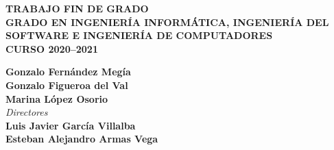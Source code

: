 \newpage
\thispagestyle{empty}
\renewcommand{\baselinestretch}{1}\normalsize
\vspace*{3ex}
  \begin{center}
       {}
  \end{center}
\vspace*{2ex}
\begin{center}
  {\Large {\bf TRABAJO FIN DE GRADO}}\\ [0.8em]
    {\Large {\bf GRADO EN INGENIER\'IA INFORM\'ATICA, INGENIERÍA DEL SOFTWARE E INGENIERÍA DE COMPUTADORES}}\\ [0.8em]
    {\Large {\bf CURSO 2020--2021}} 
\end{center}
\vspace*{2ex}
\begin{large}
\begin{center}
  {\bf Gonzalo Fernández Megía}\\ [0.3em]
  {\bf Gonzalo Figueroa del Val}\\ [0.3em]
  {\bf Marina López Osorio}\\
  
  
\vspace*{3ex}
{\it Directores}\\ [0.5em]
  {\bf Luis Javier Garc\'ia Villalba} \\ [0.3em]
  {\bf Esteban Alejandro Armas Vega}
  \vspace*{6ex}

\\[0.2em]
\\[0.2em]
\\[0.5em]
   \mbox{ } \\ 
\end{center}
\end{large}
\vfill

